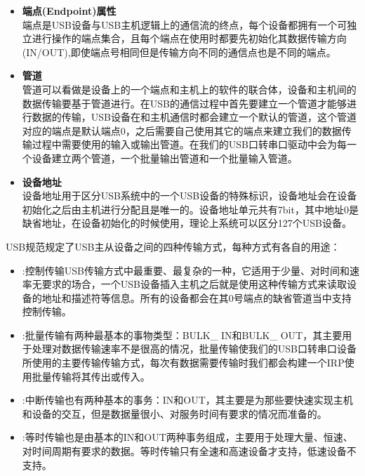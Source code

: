 \begin{enumerate}
\begin{itemize}
	\item \textbf{端点(Endpoint)属性}\\
	端点是USB设备与USB主机逻辑上的通信流的终点，每个设备都拥有一个可独立进行操作的端点集合，且每个端点在使用时都要先初始化其数据传输方向(IN/OUT),即使端点号相同但是传输方向不同的通信点也是不同的端点\cite{李雪红2004USB}。
	
	\item \textbf{管道}\\
	管道可以看做是设备上的一个端点和主机上的软件的联合体，设备和主机间的数据传输要基于管道进行。在USB的通信过程中首先要建立一个管道才能够进行数据的传输，USB设备在和主机通信时都会建立一个默认的管道，这个管道对应的端点是默认端点0，之后需要自己使用其它的端点来建立我们的数据传输过程中需要使用的输入或输出管道。在我们的USB口转串口驱动中会为每一个设备建立两个管道，一个批量输出管道和一个批量输入管道。
	
	\item \textbf{设备地址}\\
	设备地址用于区分USB系统中的一个USB设备的特殊标识，设备地址会在设备初始化之后由主机进行分配且是唯一的。设备地址单元共有7bit，其中地址0是缺省地址，在设备初始化的时候使用，理论上系统可以区分127个USB设备\cite{李雪红2004USB}。
	\end{itemize}	
	
\end{enumerate}



\noindent USB规范规定了USB主从设备之间的四种传输方式，每种方式有各自的用途\cite{USB总线接口开发指南}：
\begin{itemize}
\item {}:控制传输USB传输方式中最重要、最复杂的一种，它适用于少量、对时间和速率无要求的场合，一个USB设备插入主机之后就是使用这种传输方式来读取设备的地址和描述符等信息。所有的设备都会在其0号端点的缺省管道当中支持控制传输\cite{张杰2008基于}。
\item {}:批量传输有两种最基本的事物类型：BULK\_ IN和BULK\_ OUT，其主要用于处理对数据传输速率不是很高的情况，批量传输使我们的USB口转串口设备所使用的主要传输传输方式，每次有数据需要传输时我们都会构建一个IRP使用批量传输将其传出或传入。
\item {}:中断传输也有两种基本的事务：IN和OUT，其主要是为那些要快速实现主机和设备的交互，但是数据量很小、对服务时间有要求的情况而准备的。
\item {}:等时传输也是由基本的IN和OUT两种事务组成，主要用于处理大量、恒速、对时间周期有要求的数据。等时传输只有全速和高速设备才支持，低速设备不支持\cite{张杰2008基于}。
\end{itemize}



